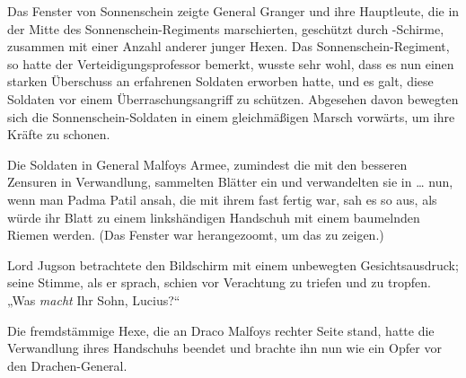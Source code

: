 Das Fenster von Sonnenschein zeigte General Granger und ihre Hauptleute, die in der Mitte des Sonnenschein-Regiments marschierten, geschützt durch -Schirme, zusammen mit einer Anzahl anderer junger Hexen. Das Sonnenschein-Regiment, so hatte der Verteidigungsprofessor bemerkt, wusste sehr wohl, dass es nun einen starken Überschuss an erfahrenen Soldaten erworben hatte, und es galt, diese Soldaten vor einem Überraschungsangriff zu schützen. Abgesehen davon bewegten sich die Sonnenschein-Soldaten in einem gleichmäßigen Marsch vorwärts, um ihre Kräfte zu schonen.

Die Soldaten in General Malfoys Armee, zumindest die mit den besseren Zensuren in Verwandlung, sammelten Blätter ein und verwandelten sie in … nun, wenn man Padma Patil ansah, die mit ihrem fast fertig war, sah es so aus, als würde ihr Blatt zu einem linkshändigen Handschuh mit einem baumelnden Riemen werden. (Das Fenster war herangezoomt, um das zu zeigen.)

Lord Jugson betrachtete den Bildschirm mit einem unbewegten Gesichtsausdruck; seine Stimme, als er sprach, schien vor Verachtung zu triefen und zu tropfen.
„Was \emph{macht} Ihr Sohn, Lucius?“

Die fremdstämmige Hexe, die an Draco Malfoys rechter Seite stand, hatte die Verwandlung ihres Handschuhs beendet und brachte ihn nun wie ein Opfer vor den Drachen-General.

